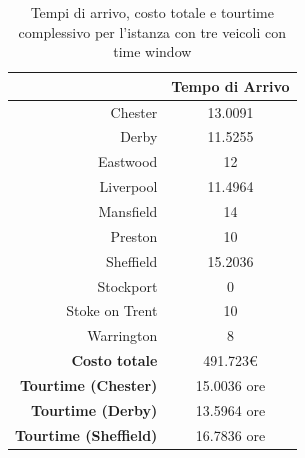 
		\begin{table}[H]
			\tiny
			\centering
			\begin{tabular}{rc}

				\toprule
				& Tempo di Arrivo \\

				\midrule
				Chester & 13.0091 \\
				Derby & 11.5255 \\
				Eastwood & 12 \\
				Liverpool & 11.4964 \\
				Mansfield & 14 \\
				Preston  & 10 \\
				Sheffield & 15.2036 \\
				Stockport & 0 \\
				Stoke on Trent & 10 \\
				Warrington & 8 \\


				\midrule
				\textbf{Costo totale} & 491.723€ \\
				\textbf{Tourtime (Chester)} & 15.0036 ore \\
				\textbf{Tourtime (Derby)} & 13.5964 ore \\
				\textbf{Tourtime (Sheffield)} & 16.7836 ore \\
				\bottomrule
			\end{tabular}
			\label{table:instance_5_totale}
			\caption{Tempi di arrivo, costo totale e tourtime complessivo per l'istanza con tre veicoli con time window}
		\end{table}

